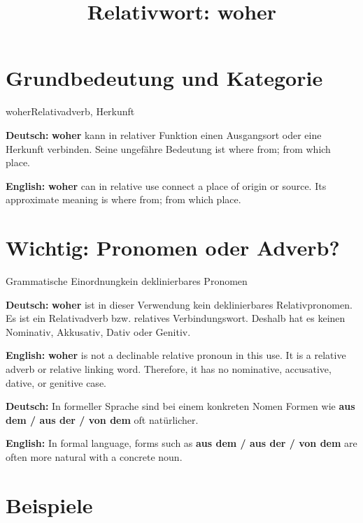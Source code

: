 \documentclass[a4paper,11pt]{article}
\title{Relativwort: \glqq woher\grqq{}}
\date{}
\newcommand{\GermanText}[1]{\textbf{Deutsch: }#1\par}
\newcommand{\EnglishText}[1]{{\small\color{SoftGray}\textbf{English: }#1\par}}
\begin{document}
\maketitle

\tableofcontents

\newpage

\section{Grundbedeutung und Kategorie}

\begin{grammarentry}{woher}{Relativadverb, Herkunft}

\GermanText{\textbf{woher} kann in relativer Funktion einen Ausgangsort oder eine Herkunft verbinden. Seine ungefähre Bedeutung ist \glqq where from; from which place\grqq{}.}

\EnglishText{\textbf{woher} can in relative use connect a place of origin or source. Its approximate meaning is \glqq where from; from which place\grqq{}.}

\end{grammarentry}

\section{Wichtig: Pronomen oder Adverb?}

\begin{grammarentry}{Grammatische Einordnung}{kein deklinierbares Pronomen}

\GermanText{\textbf{woher} ist in dieser Verwendung kein deklinierbares Relativpronomen. Es ist ein Relativadverb bzw. relatives Verbindungswort. Deshalb hat es keinen Nominativ, Akkusativ, Dativ oder Genitiv.}

\EnglishText{\textbf{woher} is not a declinable relative pronoun in this use. It is a relative adverb or relative linking word. Therefore, it has no nominative, accusative, dative, or genitive case.}

\GermanText{In formeller Sprache sind bei einem konkreten Nomen Formen wie \textbf{aus dem / aus der / von dem} oft natürlicher.}

\EnglishText{In formal language, forms such as \textbf{aus dem / aus der / von dem} are often more natural with a concrete noun.}

\end{grammarentry}

\section{Beispiele}
\end{document}
